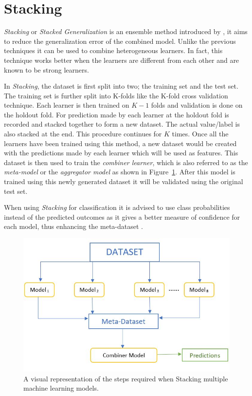 \section{Stacking}
\textit{Stacking} or \textit{Stacked Generalization} is an ensemble method introduced by \citet{wolpert1992stacked}, it aims to reduce the generalization error of the combined model. Unlike the previous techniques it can be used to combine heterogeneous learners. In fact, this technique works better when the learners are different from each other and are known to be strong learners.  

In \textit{Stacking}, the dataset is first split into two; the training set and the test set. The training set is further split into K-folds like the K-fold cross validation technique. Each learner is then trained on $K-1$ folds and validation is done on the holdout fold. For prediction made by each learner at the holdout fold is recorded and stacked together to form a new dataset. The actual value/label is also stacked at the end. This procedure continues for $K$ times. Once all the learners have been trained using this method, a new dataset would be created with the predictions made by each learner which will be used as features. This dataset is then used to train the \textit{combiner learner}, which is also referred to as the \textit{meta-model} or the \textit{aggregator model} as shown in Figure~\ref{fig:stackingexample}. After this model is trained using this newly generated dataset it will be validated using the original test set. 

When using \textit{Stacking} for classification it is advised to use class probabilities instead of the predicted outcomes as it gives a better measure of confidence for each model, thus enhancing the meta-dataset \citep{ting1999issues}. 

\begin{figure}
  \includegraphics{graphics/ensemble_methods/stacking_example.JPG}
  \caption{
     A visual representation of the steps required when Stacking multiple machine learning models.
  }
  \label{fig:stackingexample}
\end{figure}

